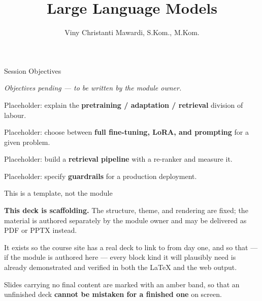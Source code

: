 \documentclass[aspectratio=169,11pt,t]{beamer}
\title{Large Language Models}
\author{Viny Christanti Mawardi, S.Kom., M.Kom.}
\date{}
\begin{document}
\covertitle

\begin{frame}[shrink=25]{Session Objectives}
\begin{isteps}
\item \textit{Objectives pending --- to be written by the module owner.}
\item Placeholder: explain the \textbf{pretraining / adaptation / retrieval} division of labour.
\item Placeholder: choose between \textbf{full fine-tuning, LoRA, and prompting} for a given problem.
\item Placeholder: build a \textbf{retrieval pipeline} with a re-ranker and measure it.
\item Placeholder: specify \textbf{guardrails} for a production deployment.
\end{isteps}

\vskip 6pt
\vskip 4pt
\vskip 2pt
\end{frame}

\begin{frame}[shrink=25]{This is a template, not the module}
\begin{iband}[amber]
\textbf{This deck is scaffolding.} The structure, theme, and rendering are fixed; the material is authored separately by the module owner and may be delivered as PDF or PPTX instead.
\end{iband}
{\fontsize{9.4}{12.6}\selectfont\color{fg2}It exists so the course site has a real deck to link to from day one, and so that --- if the module is authored here --- every block kind it will plausibly need is already demonstrated and verified in both the LaTeX and the web output.\par}\vskip 4pt
{\fontsize{9.4}{12.6}\selectfont\color{fg2}Slides carrying no final content are marked with an amber band, so that an unfinished deck \textbf{cannot be mistaken for a finished one} on screen.\par}\vskip 4pt
\end{frame}
\end{document}
